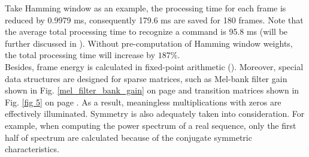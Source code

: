 Take Hamming window as an example, the processing time for each frame is reduced by 0.9979 ms, consequently 179.6 ms are saved for 180 frames. Note that the average total processing time to recognize a command is 95.8 ms (will be further discussed in ). Without pre-computation of Hamming window weights, the total processing time will increase by $187\%$.\\

Besides, frame energy is calculated in fixed-point arithmetic (). Moreover, special data structures are designed for sparse matrices, such as Mel-bank filter gain shown in Fig. \ref{mel_filter_bank_gain} on page \pageref{mel_filter_bank_gain} and transition matrices shown in Fig. \ref{fig 5} on page \pageref{fig 5}. As a result, meaningless multiplications with zeros are effectively illuminated. Symmetry is also adequately taken into consideration. For example, when computing the power spectrum of a real sequence, only the first half of spectrum are calculated because of the conjugate symmetric characteristics.
